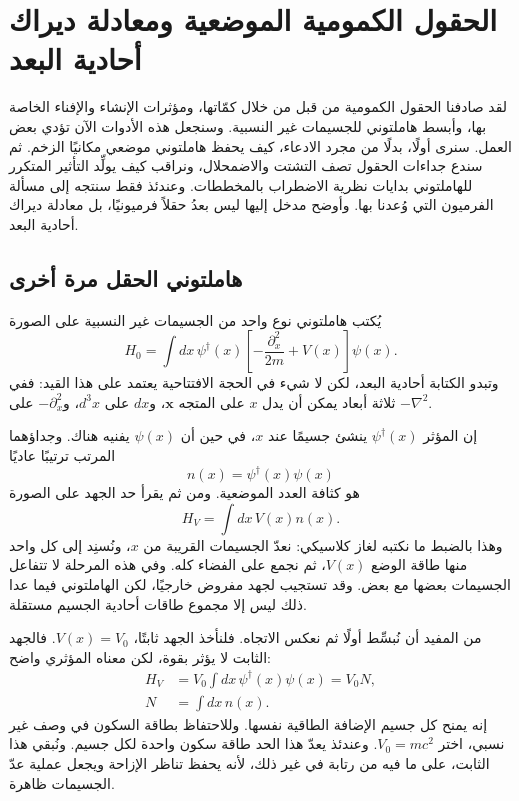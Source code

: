 \chapter{الحقول الكمومية الموضعية ومعادلة ديراك أحادية البعد}

لقد صادفنا الحقول الكمومية من قبل من خلال كمّاتها، ومؤثرات الإنشاء والإفناء الخاصة بها، وأبسط هاملتوني للجسيمات غير النسبية. وسنجعل هذه الأدوات الآن تؤدي بعض العمل. سنرى أولًا، بدلًا من مجرد الادعاء، كيف يحفظ هاملتوني موضعي مكانيًا الزخم. ثم سندع جداءات الحقول تصف التشتت والاضمحلال، ونراقب كيف يولِّد التأثير المتكرر للهاملتوني بدايات نظرية الاضطراب بالمخططات. وعندئذ فقط سنتجه إلى مسألة الفرميون التي وُعدنا بها. وأوضح مدخل إليها ليس بعدُ حقلاً فرميونيًا، بل معادلة ديراك أحادية البعد.

\section{هاملتوني الحقل مرة أخرى}

يُكتب هاملتوني نوع واحد من الجسيمات غير النسبية على الصورة
\begin{equation}
H_0=\int dx\,
\psi^\dagger(x)
\left[-\frac{\partial_x^2}{2m}+V(x)\right]
\psi(x).
\label{eq:l9-nonrel-hamiltonian}
\end{equation}
وتبدو الكتابة أحادية البعد، لكن لا شيء في الحجة الافتتاحية يعتمد على هذا القيد: ففي ثلاثة أبعاد يمكن أن يدل \(x\) على المتجه \(\mathbf{x}\)، و\(dx\) على \(d^3x\)، و\(-\partial_x^2\) على \(-\nabla^2\).

إن المؤثر \(\psi^\dagger(x)\) ينشئ جسيمًا عند \(x\)، في حين أن \(\psi(x)\) يفنيه هناك. وجداؤهما المرتب ترتيبًا عاديًا
\begin{equation}
n(x)=\psi^\dagger(x)\psi(x)
\end{equation}
هو كثافة العدد الموضعية. ومن ثم يقرأ حد الجهد على الصورة
\begin{equation}
H_V=\int dx\,V(x)n(x).
\end{equation}
وهذا بالضبط ما نكتبه لغاز كلاسيكي: نعدّ الجسيمات القريبة من \(x\)، ونُسنِد إلى كل واحد منها طاقة الوضع \(V(x)\)، ثم نجمع على الفضاء كله. وفي هذه المرحلة لا تتفاعل الجسيمات بعضها مع بعض. وقد تستجيب لجهد مفروض خارجيًا، لكن الهاملتوني فيما عدا ذلك ليس إلا مجموع طاقات أحادية الجسيم مستقلة.

من المفيد أن نُبسِّط أولًا ثم نعكس الاتجاه. فلنأخذ الجهد ثابتًا، \(V(x)=V_0\). فالجهد الثابت لا يؤثر بقوة، لكن معناه المؤثري واضح:
\begin{equation}
\begin{aligned}
H_V&=V_0\int dx\,\psi^\dagger(x)\psi(x)=V_0N,\\
N&=\int dx\,n(x).
\end{aligned}
\end{equation}
إنه يمنح كل جسيم الإضافة الطاقية نفسها. وللاحتفاظ بطاقة السكون في وصف غير نسبي، اختر \(V_0=mc^2\). وعندئذ يعدّ هذا الحد طاقة سكون واحدة لكل جسيم. ونُبقي هذا الثابت، على ما فيه من رتابة في غير ذلك، لأنه يحفظ تناظر الإزاحة ويجعل عملية عدّ الجسيمات ظاهرة.

